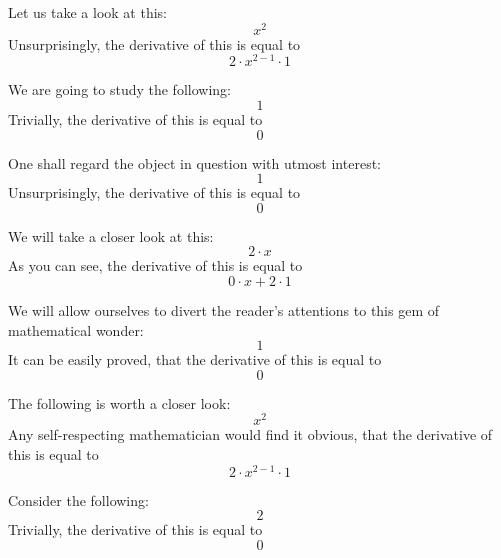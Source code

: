 \documentclass{article}
\begin{document}
Let us take a look at this:
\begin{equation}
x ^{2 } 
\end{equation}
Unsurprisingly, the derivative of this is equal to
\begin{equation}
2 \cdot x ^{2 - 1 } \cdot 1 
\end{equation}

We are going to study the following:
\begin{equation}
1 
\end{equation}
Trivially, the derivative of this is equal to
\begin{equation}
0 
\end{equation}

One shall regard the object in question with utmost interest:
\begin{equation}
1 
\end{equation}
Unsurprisingly, the derivative of this is equal to
\begin{equation}
0 
\end{equation}

We will take a closer look at this:
\begin{equation}
2 \cdot x 
\end{equation}
As you can see, the derivative of this is equal to
\begin{equation}
0 \cdot x + 2 \cdot 1 
\end{equation}

We will allow ourselves to divert the reader's attentions to this gem of mathematical wonder:
\begin{equation}
1 
\end{equation}
It can be easily proved, that the derivative of this is equal to
\begin{equation}
0 
\end{equation}

The following is worth a closer look:
\begin{equation}
x ^{2 } 
\end{equation}
Any self-respecting mathematician would find it obvious, that the derivative of this is equal to
\begin{equation}
2 \cdot x ^{2 - 1 } \cdot 1 
\end{equation}

Consider the following:
\begin{equation}
2 
\end{equation}
Trivially, the derivative of this is equal to
\begin{equation}
0 
\end{equation}
\end{document}
